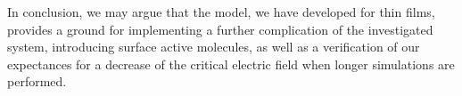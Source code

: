 In conclusion, we may argue that the model, we have developed for thin films, provides a ground for implementing a further complication of the investigated system, introducing surface active molecules, as well as a verification of our expectances for a decrease of the critical electric field when longer simulations are performed.     



